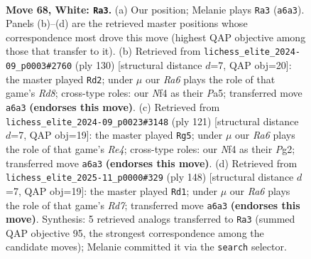 \documentclass[11pt]{article}
\begin{document}
\clearpage

\begin{figure}[p]\centering
\begin{subfigure}{0.46\textwidth}\centering
\resizebox{\linewidth}{!}{%
\newchessgame
\chessboard[
  setfen={8/8/R7/1k6/5N2/8/2K3P1/4r3 w - - 0 68},
  showmover=false,
  pgfstyle=straightmove, color=movearrow, markmove={a6-a3}
]}
\caption{}
\end{subfigure}\hfill
\begin{subfigure}{0.46\textwidth}\centering
\resizebox{\linewidth}{!}{%
\newchessgame
\chessboard[
  setfen={3R4/4k3/8/P7/K7/8/8/1r6 w - - 23 66},
  showmover=false,
  pgfstyle=straightmove, color=movearrow, markmove={d8-d2}
]}
\caption{}
\end{subfigure}
\\[4pt]
\begin{subfigure}{0.46\textwidth}\centering
\resizebox{\linewidth}{!}{%
\newchessgame
\chessboard[
  setfen={8/7R/8/4r3/3K4/8/5kp1/8 b - - 7 61},
  showmover=false,
  pgfstyle=straightmove, color=movearrow, markmove={e5-g5}
]}
\caption{}
\end{subfigure}\hfill
\begin{subfigure}{0.46\textwidth}\centering
\resizebox{\linewidth}{!}{%
\newchessgame
\chessboard[
  setfen={8/3R4/4k3/PK6/8/8/7r/8 w - - 13 75},
  showmover=false,
  pgfstyle=straightmove, color=movearrow, markmove={d7-d1}
]}
\caption{}
\end{subfigure}
\caption{\textbf{Move 68, White: \texttt{Ra3}.} (a) Our position; Melanie plays \texttt{Ra3} (\texttt{a6a3}). Panels (b)--(d) are the retrieved master positions whose correspondence most drove this move (highest QAP objective among those that transfer to it). (b) Retrieved from \texttt{lichess\_elite\_2024-09\_p0003\#2760} (ply 130) [structural distance $d$=7, QAP obj=20]: the master played \texttt{Rd2}; under $\mu$ our \emph{Ra6} plays the role of that game's \emph{Rd8}; cross-type roles: our \emph{N}f4 as their \emph{P}a5; transferred move \texttt{a6a3} \textbf{(endorses this move)}. (c) Retrieved from \texttt{lichess\_elite\_2024-09\_p0023\#3148} (ply 121) [structural distance $d$=7, QAP obj=19]: the master played \texttt{Rg5}; under $\mu$ our \emph{Ra6} plays the role of that game's \emph{Re4}; cross-type roles: our \emph{N}f4 as their \emph{P}g2; transferred move \texttt{a6a3} \textbf{(endorses this move)}. (d) Retrieved from \texttt{lichess\_elite\_2025-11\_p0000\#329} (ply 148) [structural distance $d$=7, QAP obj=19]: the master played \texttt{Rd1}; under $\mu$ our \emph{Ra6} plays the role of that game's \emph{Rd7}; transferred move \texttt{a6a3} \textbf{(endorses this move)}. Synthesis: 5 retrieved analogs transferred to \texttt{Ra3} (summed QAP objective 95, the strongest correspondence among the candidate moves); Melanie committed it via the \texttt{search} selector.}
\label{fig:thought-m134}
\end{figure}
\end{document}
